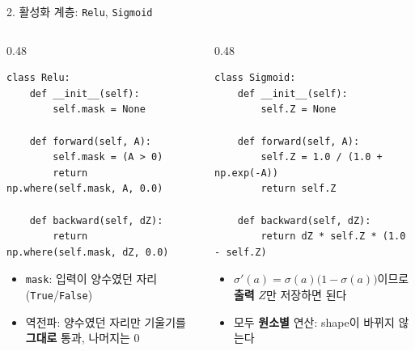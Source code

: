 \documentclass[aspectratio=169,11pt]{beamer}
\newcommand{\code}[1]{\texttt{#1}}
\begin{document}
\begin{frame}[fragile]{2. 활성화 계층: \code{Relu}, \code{Sigmoid}}
\begin{columns}[T,onlytextwidth]
\begin{column}{0.48\textwidth}
\begin{lstlisting}
class Relu:
    def __init__(self):
        self.mask = None

    def forward(self, A):
        self.mask = (A > 0)
        return np.where(self.mask, A, 0.0)

    def backward(self, dZ):
        return np.where(self.mask, dZ, 0.0)
\end{lstlisting}
\small
\begin{itemize}
\item \code{mask}: 입력이 양수였던 자리 (\code{True}/\code{False})
\item 역전파: 양수였던 자리만 기울기를 \textbf{그대로} 통과, 나머지는 $0$
\end{itemize}
\end{column}
\begin{column}{0.48\textwidth}
\begin{lstlisting}
class Sigmoid:
    def __init__(self):
        self.Z = None

    def forward(self, A):
        self.Z = 1.0 / (1.0 + np.exp(-A))
        return self.Z

    def backward(self, dZ):
        return dZ * self.Z * (1.0 - self.Z)
\end{lstlisting}
\small
\begin{itemize}
\item $\sigma'(a)=\sigma(a)\bigl(1-\sigma(a)\bigr)$이므로 \textbf{출력} $Z$만 저장하면 된다
\item 모두 \textbf{원소별} 연산: shape이 바뀌지 않는다
\end{itemize}
\end{column}
\end{columns}
\end{frame}
\end{document}
